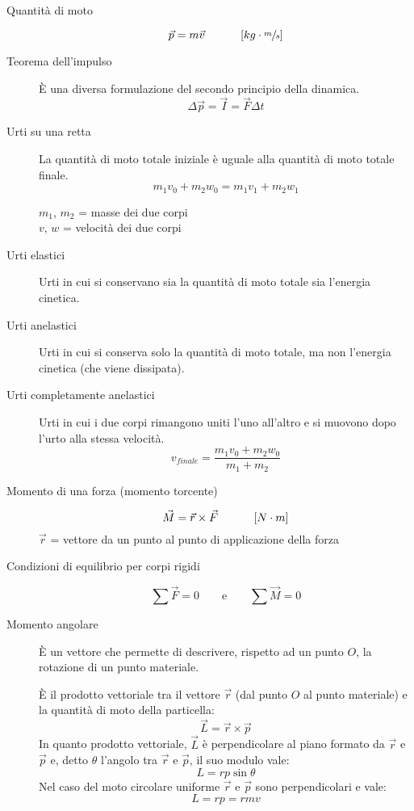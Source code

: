 \documentclass[a4paper,11pt,italian]{article}
\begin{document}
\begin{description}
  \item[Quantità di moto] 
  \[ \vec{p} = m \vec{v} \hspace*{3em} \left[ kg \cdot \sfrac{m}{s} \right] \] 
  
  \item[Teorema dell'impulso] 
  È una diversa formulazione del secondo principio della dinamica.
  \[ \Delta \vec{p} = \vec{I} = \vec{F} \Delta t \]
  
  \item[Urti su una retta] 
  La quantità di moto totale iniziale è uguale alla quantità di moto totale finale.
  \[ m_1 v_0 + m_2 w_0 = m_1 v_1 + m_2 w_1 \]
  \begin{multicols}{2}
  $ m_1 $, $ m_2 $ = masse dei due corpi\\
  $ v $, $ w $ = velocità dei due corpi
  \end{multicols}
  
  \item[Urti elastici] 
  Urti in cui si conservano sia la quantità di moto totale sia l'energia cinetica.
  
  \item[Urti anelastici] 
  Urti in cui si conserva solo la quantità di moto totale, ma non l'energia cinetica (che viene dissipata).
  
  \item[Urti completamente anelastici] 
  Urti in cui i due corpi rimangono uniti l'uno all'altro e si muovono dopo l'urto alla stessa velocità.
  \[ v_{finale} = \frac{m_1 v_0 + m_2 w_0}{m_1 + m_2} \]
  
  \item[Momento di una forza (momento torcente)]
  \[ \vec{M} = \vec{r} \times \vec{F} \hspace*{3em} \left[ N \cdot m \right] \]
  $ \vec{r} $ = vettore da un punto al punto di applicazione della forza
  
  \item[Condizioni di equilibrio per corpi rigidi]
  \[ \sum \vec{F} = 0 \quad\quad\textrm{e}\quad\quad \sum \vec{M} = 0 \]

  \item[Momento angolare] 
  È un vettore che permette di descrivere, rispetto ad un punto $ O $, la rotazione di un punto materiale.
  
  È il prodotto vettoriale tra il vettore $ \vec{r} $ (dal punto $ O $ al punto materiale) e la quantità di moto della particella:
  \[ \vec{L} = \vec{r} \times \vec{p} \]
  In quanto prodotto vettoriale, $ \vec{L} $ è perpendicolare al piano formato da $ \vec{r} $ e $ \vec{p} $ e, detto $ \theta $ l'angolo tra $ \vec{r} $ e $ \vec{p} $, il suo modulo vale: 
  \[ L = rp\sin\theta \]
  Nel caso del moto circolare uniforme $ \vec{r} $ e $ \vec{p} $ sono perpendicolari e vale:
  \[ L = rp = rmv \]
  

\end{description}
\end{document}
